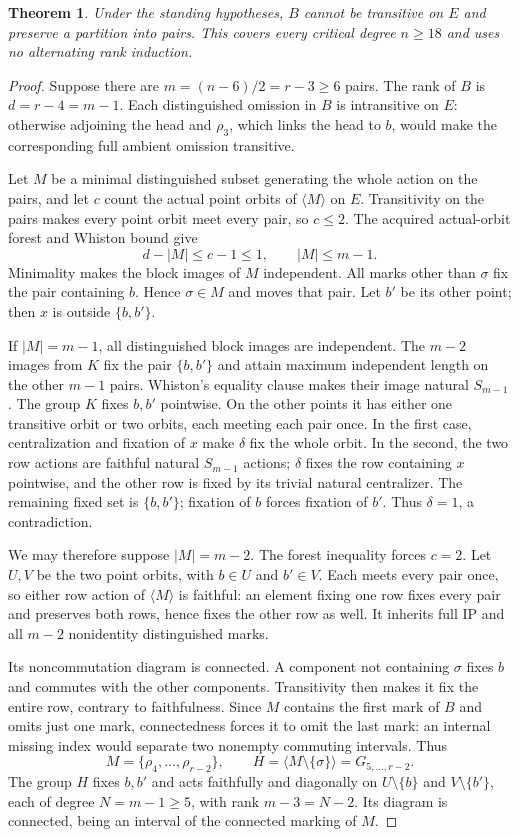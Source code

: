 \documentclass[11pt,a4paper]{article}
\newtheorem{theorem}[lemma]{Theorem}
\newcommand{\gen}[1]{\langle#1\rangle}
\begin{document}
\begin{theorem}
Under the standing hypotheses, $B$ cannot be transitive on $E$
and preserve a partition into pairs. This covers every
critical degree $n\ge18$ and uses no alternating rank induction.
\end{theorem}
\begin{proof}
Suppose there are $m=(n-6)/2=r-3\ge6$ pairs. The rank
of $B$ is $d=r-4=m-1$. Each distinguished omission in $B$
is intransitive on $E$: otherwise adjoining the head and
$\rho_3$, which links the head to $b$, would make the
corresponding full ambient omission transitive.

Let $M$ be a minimal distinguished subset generating the
whole action on the pairs, and let $c$ count the actual
point orbits of $\gen M$ on $E$. Transitivity on the pairs
makes every point orbit meet every pair, so $c\le2$.
The acquired actual-orbit forest and Whiston bound give
\[
               d-|M|\le c-1\le1,\qquad |M|\le m-1.
\]
Minimality makes the block images of $M$ independent.
All marks other than $\sigma$ fix the pair containing $b$.
Hence $\sigma\in M$ and moves that pair. Let $b'$ be its
other point; then $x$ is outside $\{b,b'\}$.

If $|M|=m-1$, all distinguished block images are independent.
The $m-2$ images from $K$ fix the pair $\{b,b'\}$ and
attain maximum independent length on the other $m-1$ pairs.
Whiston's equality clause makes their image natural $S_{m-1}$.
The group $K$ fixes $b,b'$ pointwise. On the other points
it has either one transitive orbit or two orbits, each meeting
each pair once. In the first case, centralization and fixation
of $x$ make $\delta$ fix the whole orbit. In the second,
the two row actions are faithful natural $S_{m-1}$ actions;
$\delta$ fixes the row containing $x$ pointwise, and the
other row is fixed by its trivial natural centralizer.
The remaining fixed set is $\{b,b'\}$; fixation of $b$
forces fixation of $b'$. Thus $\delta=1$, a contradiction.

We may therefore suppose $|M|=m-2$. The forest inequality
forces $c=2$. Let $U,V$ be the two point orbits, with
$b\in U$ and $b'\in V$. Each meets every pair once,
so either row action of $\gen M$ is faithful: an element
fixing one row fixes every pair and preserves both rows,
hence fixes the other row as well. It inherits full IP
and all $m-2$ nonidentity distinguished marks.

Its noncommutation diagram is connected. A component not
containing $\sigma$ fixes $b$ and commutes with the other
components. Transitivity then makes it fix the entire row,
contrary to faithfulness. Since $M$ contains the first mark
of $B$ and omits just one mark, connectedness forces it
to omit the last mark: an internal missing index would
separate two nonempty commuting intervals. Thus
\[
 M=\{\rho_4,\ldots,\rho_{r-2}\},\qquad
 H=\gen{M\setminus\{\sigma\}}=G_{5,\ldots,r-2}.
\]
The group $H$ fixes $b,b'$ and acts faithfully and diagonally
on $U\setminus\{b\}$ and $V\setminus\{b'\}$,
each of degree $N=m-1\ge5$, with rank $m-3=N-2$.
Its diagram is connected, being an interval of the connected
marking of $M$.


\end{proof}
\end{document}
